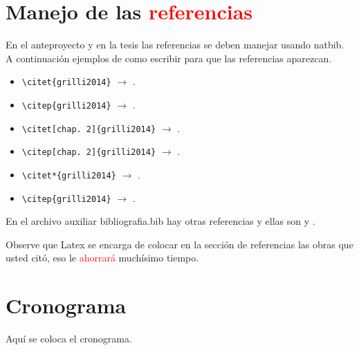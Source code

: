 \documentclass[12pt]{article}
\begin{document}
\section{Manejo de las \textcolor{red}{referencias}}
En el anteproyecto y en la tesis las referencias se deben manejar usando natbib. A continuación ejemplos de como escribir para que las referencias aparezcan.

\begin{itemize}
	\item \verb|\citet{grilli2014}| $\longrightarrow$ \citet{grilli2014}. \\
	\item \verb|\citep{grilli2014}| $\longrightarrow$ \citep{grilli2014}. \\
	\item \verb|\citet[chap. 2]{grilli2014}| $\longrightarrow$ \citet[chap. 2]{grilli2014}. \\
	\item \verb|\citep[chap. 2]{grilli2014}| $\longrightarrow$ \citep[chap. 2]{grilli2014}. \\
	\item \verb|\citet*{grilli2014}| $\longrightarrow$ \citet{grilli2014}. \\
	\item \verb|\citep{grilli2014}| $\longrightarrow$ \citep{grilli2014}. \\
\end{itemize}

En el archivo auxiliar bibliografia.bib hay otras referencias y ellas son \citet{softwareR} y \citet{natbib}.

Observe que Latex se encarga de colocar en la sección de referencias las obras que usted citó, eso le \textcolor{red}{ahorrará} muchísimo tiempo.
\section{Cronograma}
Aquí se coloca el cronograma.
\end{document}
